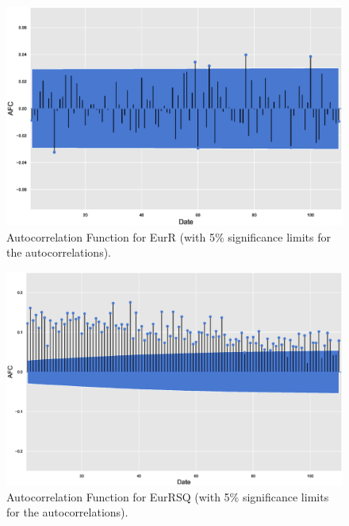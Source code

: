 	\begin{figure}[!ht]
	\centering
	\includegraphics[width=\textwidth]{chapters/chapter_mvts/figures/pautofun2.eps}
	\caption{Autocorrelation Function for EurR (with 5\% significance limits for the autocorrelations). \label{fig:pautofun2}}
	\end{figure}

	\begin{figure}[!ht]
	\centering
	\includegraphics[width=\textwidth]{chapters/chapter_mvts/figures/pautofun3.eps}
	\caption{Autocorrelation Function for EurRSQ (with 5\% significance limits for the autocorrelations). \label{fig:pautofun3}}
	\end{figure}


